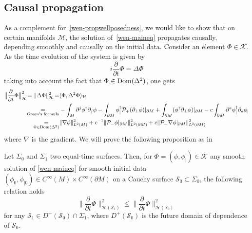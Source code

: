 \subsection{Causal propagation}\label{wen-subsect-causal}
As a complement for~\cref{wen-propwellposedness},
we would like to show that on certain manifolds $\mathcal{M}$, 
the solution of~\cref{wen-maineq} propagates causally, \ie depending smoothly and causally on the initial data.
Consider an element $\Phi \in \mathcal{K}$.
As the time evolution of the system is given by
\begin{equation*}
i \frac{\partial }{\partial t} \Phi = \Delta \Phi 
\end{equation*}
taking into account the fact that $\Phi\in\mathrm{Dom}(\Delta^2)$, one gets
\begin{equation}\label{wen-tobebounded}
\begin{split}
\big\| \frac{\partial }{\partial t} \Phi \big\|^2_\mathcal{H} = \| \Delta \Phi \|^2_{\mathcal{H}}  = &
\langle \Phi, \Delta^2 \Phi \rangle_{\mathcal{H}}   \\ 
\underset{\textrm{Green's formula}}=
& - \int_M \partial^j \phi^\dagger \partial_j \phi 
 -  \int_{\partial M}\phi_|^\dagger \mathcal{P}_+(\partial_\bot \phi)\vert_{\partial M} 
 + \int_{\partial M} (\phi^\dagger \partial_\bot\phi)\vert_{\partial M}
- c\int_{\partial M} \partial^a \phi^\dagger_| \partial_a \phi_| \\
\underset{\Phi \in \mathrm{Dom}(\Delta^2)}{=} &
\|\nabla \phi \|^2_{L^2 (M)} + c^{-1} \| \mathcal{P}_- \phi\vert_{\partial M} \|^2_{L^2(\partial M)}
+ c \| \mathcal{P}_+ \nabla \phi\vert_{\partial M} \|^2_{L^2(\partial M)}
\end{split}
\end{equation}
where $\nabla$ is the gradient.
We will prove the following proposition as in~\cite{Zahn2016}
\begin{proposition}\label{wen-propcau}
Let $\Sigma_0$ and $\Sigma_1$ two equal-time surfaces. 
Then, for $\Phi = (\phi, \phi_|) \in \mathcal{K}$ any smooth solution of \cref{wen-maineq} for smooth initial data $(\phi_0, \phi_{|0}) \in C^\infty(M) \times C^\infty(\partial M)$ on a Cauchy surface $\mathcal{S}_0 \subset \Sigma_0$,
the following relation holds
\begin{equation}\label{wen-causal}
\big\| \frac{\partial}{\partial t} \Phi \big\|_{\mathcal{H}(\mathcal{S}_1)}^2
\leq 
\big\| \frac{\partial}{\partial t} \Phi \big\|_{\mathcal{H}(\mathcal{S}_0)}^2
\end{equation}
for any $\mathcal{S}_1 \in D^+(\mathcal{S}_0)\cap\Sigma_1$, where $D^+(\mathcal{S}_0)$ is the future domain of dependence of $\mathcal{S}_0$.
\end{proposition}
